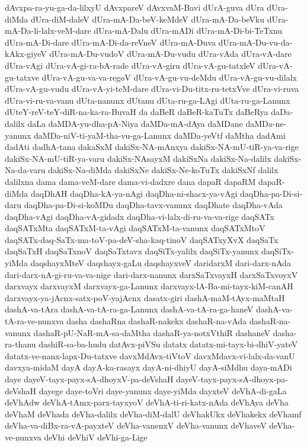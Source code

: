 {dAvxpa-ra-yu-ga-da-lilxyU
dAvxpareV
dAvxvaM-Bavi
dUrA-guva
dUra
dUra-diMda
dUra-diM-daleV
dUra-mA-Da-beV-keMdeV
dUra-mA-Da-beVku
dUra-mA-Da-li-lalx-veM-dare
dUra-mA-Dalu
dUra-mADi
dUra-mA-Di-bi-TeTxnu
dUra-mA-Di-dare
dUra-mA-Di-da-reVneV
dUra-mA-Duva
dUra-mA-Du-vu-da-kAkx-giyeV
dUra-mA-Du-vudoV
dUra-mA-Du-vudu
dUra-vAda
dUra-vA-dare
dUra-vAgi
dUra-vA-gi-ra-bA-rade
dUra-vA-giru
dUra-vA-gu-tatxleV
dUra-vA-gu-tatxve
dUra-vA-gu-va-va-regoV
dUra-vA-gu-vu-deMdu
dUra-vA-gu-vu-dilalx
dUra-vA-gu-vudu
dUra-vA-yi-teM-dare
dUra-vi-Du-titx-ru-tetxVve
dUra-vi-ruva
dUra-vi-ru-va-vanu
dUta-nanunx
dUtanu
dUta-ru-ga-LAgi
dUta-ru-ga-Lanunx
dUteY-reV-teY-diR-na-ka-ra-BuvaH
da
daBeR
daBeR-kaTuTx
daBeRya
daDa-dalilx
daLa
daMDA-yu-dha-pA-Niya
daMDa-mA-dAya
daMDane
daMDa-ne-yanunx
daMDa-niV-ti-yaM-tha-vu-ga-Lanunx
daMDa-yeVtf
daMtha
dadAmi
dadAti
dadhA-tana
dakaSxM
dakiSx-NA-mAnxya
dakiSx-NA-mU-tiR-ya-va-rige
dakiSx-NA-mU-tiR-ya-varu
dakiSx-NAsayxM
dakiSxNa
dakiSx-Na-dalilx
dakiSx-Na-da-varu
dakiSx-Na-diMda
dakiSxNe
dakiSx-Ne-koTuTx
dakiSxNf
dalilx
dalilxna
dama
dama-veM-dare
dama-vi-dadxre
dana
dapaR
dapaRM
dapaR-diMda
daqDhAH
daqDha-kA-ya-nAgi
daqDha-ni-shacx-ya-vAgi
daqDha-pa-Di-si-daru
daqDha-pa-Di-si-koMDu
daqDha-tavx-vanunx
daqDhate
daqDha-vAda
daqDha-vAgi
daqDha-vA-gidadx
daqDha-vi-lalx-di-ru-va-va-rige
daqSATx
daqSATxMta
daqSATxM-ta-vAgi
daqSATxM-ta-vanunx
daqSATxMtoV
daqSATx-daq-SaTx-ma-toV-pa-deV-sha-kaq-tinoV
daqSATxyXvX
daqSaTx
daqSaTxH
daqSaTxnoV
daqSaTxtavx
daqSiTx-yalilx
daqSiTx-yanunx
daqSiTx-yiMda
daqshayxMteV
daqshayx-gaLu
daqshayxveV
daridarxM
dari-darx-nAda
dari-darx-nA-gi-ru-va-va-nige
dari-darx-nanunx
darxSaTxvayxH
darxSaTxvoyxV
darxvayx
darxvayxM
darxvayx-ga-Lanunx
darxvayx-lA-Ba-mi-tayx-kiM-canAH
darxvayx-ya-jAcnx-satx-poV-yajAcnx
dasatx-giri
dashA-maM-tAyx-maMtaH
dashA-va-tAra
dashA-va-tA-ra-ga-Lanunx
dashA-va-tA-ra-ga-haneV
dashA-va-tA-ra-ve-nunxva
dasha
dashaRna
dashaR-nakekx
dashaR-na-vAda
dashaR-na-vanunx
dashaR-pU-NaR-mA-sa-daMtha
dashaR-ya-notxVthiR
dashaneV
dasha-ra-thanu
dashiR-sa-ba-hudu
datAvx-piVSu
datatx
datatx-mi-tayx-bi-dhiV-yateV
datatx-ve-nanx-lapx-Du-tatxve
davxMdAvx-tiVtoV
davxMdavx-vi-lalx-da-vanU
davxya-midaM
dayA
dayA-ka-rasayx
dayA-ni-dhiyU
dayA-siMdhu
daya-mADi
daye
dayeV-tayx-payx-sA-dhoyxV-pa-deVshaH
dayeV-tayx-payx-sA-dhoyx-pa-deVshaH
dayege
daye-toVri
daye-yanunx
daye-yiMda
dayxteV
deVhA-di-gaLa
deVhAdw
deVhA-tAmx-parx-tayxyoV
deVhA-ti-ri-katx-nAda
deVhAya
deVha
deVhaM
deVhada
deVha-dalilx
deVha-diM-dalU
deVhakUkx
deVhakekx
deVhamf
deVha-va-diBx-ra-vA-payxteV
deVha-vanenxV
deVha-vanunx
deVhaveV
deVha-ve-nunxva
deVhi
deVhiV
deVhi-ga-Lige
}
